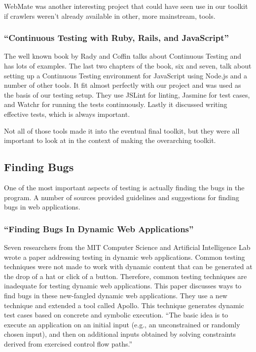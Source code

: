 \documentclass[11pt]{article}
\begin{document}
WebMate was another interesting project that could have seen use in our toolkit if crawlers weren't already available in other, more mainstream, tools.

\subsubsection{``Continuous Testing with Ruby, Rails, and JavaScript'' \cite{BookContinuousTesting}}
The well known book by Rady and Coffin talks about Continuous Testing and has lots of examples. The last two chapters of the book, six and seven, talk about setting up a Continuous Testing environment for JavaScript using Node.js and a number of other tools. It fit almost perfectly with our project and was used as the basis of our testing setup. They use JSLint for linting, Jasmine for test cases, and Watchr for running the tests continuously. Lastly it discussed writing effective tests, which is always important.

Not all of those tools made it into the eventual final toolkit, but they were all important to look at in the context of making the overarching toolkit.

\subsection{Finding Bugs}
One of the most important aspects of testing is actually finding the bugs in the program. A number of sources provided guidelines and suggestions for finding bugs in web applications.

\subsubsection{``Finding Bugs In Dynamic Web Applications'' \cite{FindingBugs}}
Seven researchers from the MIT Computer Science and Artificial Intelligence Lab wrote a paper addressing testing in dynamic web applications. Common testing techniques were not made to work with dynamic content that can be generated at the drop of a hat or click of a button. Therefore, common testing techniques are inadequate for testing dynamic web applications. This paper discusses ways to find bugs in these new-fangled dynamic web applications. They use a new technique and extended a tool called Apollo. This technique generates dynamic test cases based on concrete and symbolic execution. ``The basic idea is to execute an application on an initial input (e.g., an unconstrained or randomly chosen input), and then on additional inputs obtained by solving constraints derived from exercised control flow paths.''
\end{document}
